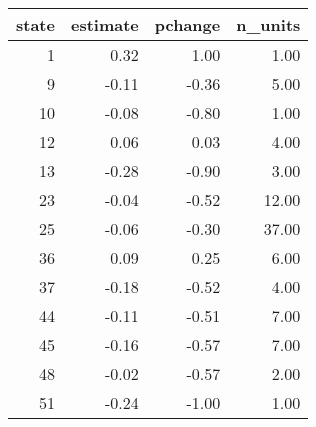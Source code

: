 \begin{table}[ht]
\centering
\begin{tabular}{rrrr}
  \hline
state & estimate & pchange & n\_units \\ 
  \hline
  1 & 0.32 & 1.00 & 1.00 \\ 
    9 & -0.11 & -0.36 & 5.00 \\ 
   10 & -0.08 & -0.80 & 1.00 \\ 
   12 & 0.06 & 0.03 & 4.00 \\ 
   13 & -0.28 & -0.90 & 3.00 \\ 
   23 & -0.04 & -0.52 & 12.00 \\ 
   25 & -0.06 & -0.30 & 37.00 \\ 
   36 & 0.09 & 0.25 & 6.00 \\ 
   37 & -0.18 & -0.52 & 4.00 \\ 
   44 & -0.11 & -0.51 & 7.00 \\ 
   45 & -0.16 & -0.57 & 7.00 \\ 
   48 & -0.02 & -0.57 & 2.00 \\ 
   51 & -0.24 & -1.00 & 1.00 \\ 
   \hline
\end{tabular}
\end{table}
